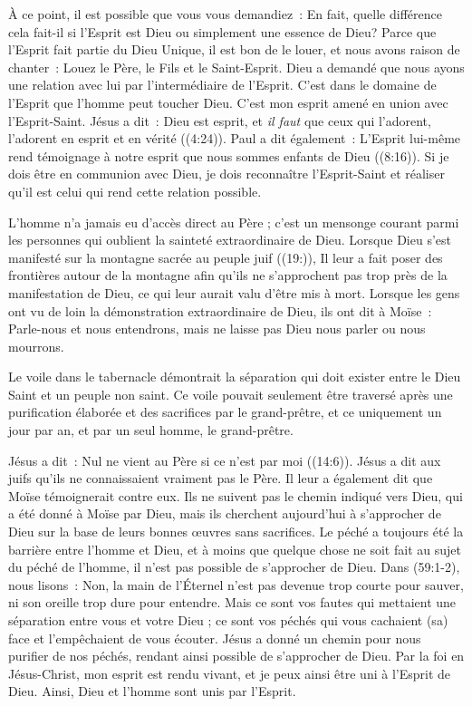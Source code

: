 À ce point, il est possible que vous vous demandiez~:
 \og En fait, quelle différence cela fait-il si l'Esprit est Dieu
 ou simplement une essence de Dieu? \fg{}
 Parce que l'Esprit fait partie du Dieu Unique, il est bon de le louer,
 et nous avons raison de chanter~:
 \og Louez le Père, le Fils et le Saint-Esprit. \fg{}
 Dieu a demandé que nous ayons une relation avec lui par l'intermédiaire
 de l'Esprit. C'est dans le domaine de l'Esprit que l'homme peut toucher Dieu.
 C'est mon esprit amené en union avec l'Esprit-Saint. Jésus a dit~:
 \og Dieu est esprit, et \emph{il faut} que ceux qui l'adorent, l'adorent en esprit
 et en vérité \fg{} ((4:24)).
 Paul a dit également~: \og L'Esprit lui-même rend témoignage à notre esprit
 que nous sommes enfants de Dieu \fg{} ((8:16)).
 Si je dois être en communion avec Dieu, je dois reconnaître l'Esprit-Saint
 et réaliser qu'il est celui qui rend cette relation possible.

L'homme n'a jamais eu d'accès direct au Père ; c'est un mensonge courant parmi
 les personnes qui oublient la sainteté extraordinaire de Dieu.
 Lorsque Dieu s'est manifesté sur la montagne sacrée au peuple juif
 ((19:)), Il leur a fait poser des frontières autour de
 la montagne afin qu'ils ne s'approchent pas trop près de la manifestation
 de Dieu, ce qui leur aurait valu d'être mis à mort.
 Lorsque les gens ont vu de loin la démonstration extraordinaire de Dieu,
 ils ont dit à Moïse~:
 \og Parle-nous et nous entendrons, mais ne laisse pas Dieu nous parler
 ou nous mourrons. \fg{}

Le voile dans le tabernacle démontrait la séparation qui doit exister entre
 le Dieu Saint et un peuple non saint.
 Ce voile pouvait seulement être traversé après une purification élaborée
 et des sacrifices par le grand-prêtre, et ce uniquement un jour par an,
 et par un seul homme, le grand-prêtre.

Jésus a dit~: \og Nul ne vient au Père si ce n'est par moi \fg{}
 ((14:6)).
 Jésus a dit aux juifs qu'ils ne connaissaient vraiment pas le Père.
 Il leur a également dit que Moïse témoignerait contre eux.
 Ils ne suivent pas le chemin indiqué vers Dieu, qui a été donné
 à Moïse par Dieu, mais ils cherchent aujourd'hui à s'approcher de Dieu
 sur la base de leurs bonnes œuvres sans sacrifices.
 Le péché a toujours été la barrière entre l'homme et Dieu, et à moins
 que quelque chose ne soit fait au sujet du péché de l'homme,
 il n'est pas possible de s'approcher de Dieu.
 Dans (59:1-2), nous lisons~:
 \og Non, la main de l'Éternel n'est pas devenue trop courte pour sauver,
 ni son oreille trop dure pour entendre.
 Mais ce sont vos fautes qui mettaient une séparation entre vous et votre Dieu ;
 ce sont vos péchés qui vous cachaient (sa) face et l'empêchaient
 de vous écouter. \fg{}
 Jésus a donné un chemin pour nous purifier de nos péchés,
 rendant ainsi possible de s'approcher de Dieu.
 Par la foi en Jésus-Christ, mon esprit est rendu vivant, et je peux ainsi
 être uni à l'Esprit de Dieu. Ainsi, Dieu et l'homme sont unis par l'Esprit.

\closechapter

